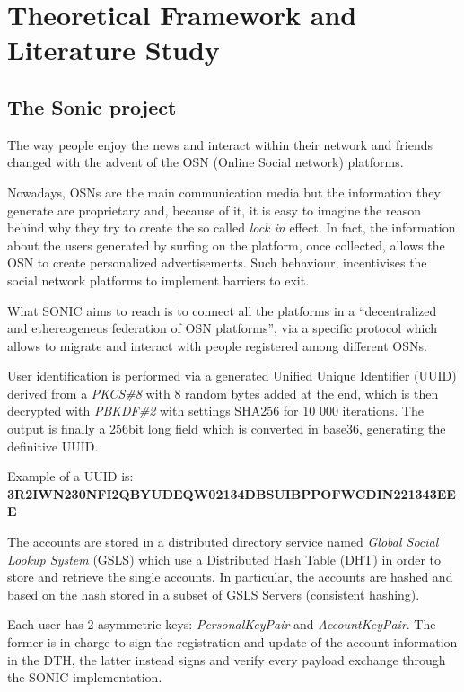 \section{Theoretical Framework and Literature Study}
\label{S:2}

\subsection{The Sonic project}

The way people enjoy the news and interact within their network and friends changed with the advent of the OSN (Online Social network) platforms. \par
Nowadays, OSNs are the main communication media but the information they generate are proprietary and, because of it, it is easy to imagine the reason behind why they try to create the so called \textit{lock in} effect.
In fact, the information about the users generated by surfing on the platform, once collected, allows the OSN to create personalized advertisements. Such behaviour, incentivises the social network platforms to implement barriers to exit. \par
What SONIC \cite{gondor_sonic:_2014} aims to reach is to connect all the platforms in a ``decentralized and ethereogeneus federation of OSN platforms'', via a specific protocol which allows to migrate and interact with people registered among different OSNs. \par
User identification is performed via a generated Unified Unique Identifier (UUID) derived from a \textit{PKCS\#8} with 8 random bytes added at the end, which is then decrypted with \textit{PBKDF\#2} with settings SHA256 for 10 000 iterations.
The output is finally a 256bit long field which is converted in base36, generating the definitive UUID. \par

Example of a UUID is: \\ \textbf{3R2IWN230NFI2QBYUDEQW02134DBSUIBPPOFWCDIN221343EEE} \par

The accounts are stored in a distributed directory service named \textit{Global Social Lookup System} (GSLS) which use a Distributed Hash Table (DHT) in order to store and retrieve the single accounts. In particular, the accounts are hashed and based on the hash stored in a subset of GSLS Servers (consistent hashing). \par

Each user has 2 asymmetric keys: \textit{PersonalKeyPair} and \textit{AccountKeyPair}. The former is in charge to sign the registration and update of the account information in the DTH, the latter instead signs and verify every payload exchange through the SONIC implementation.

